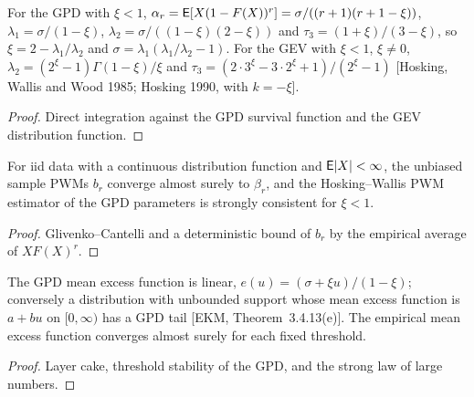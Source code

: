 \begin{theorem}
  \label{thm:l-moments}
  \leanok
  For the GPD with $\xi < 1$, $\alpha_r = \mathsf{E}[X(1-F(X))^r] = \sigma/((r+1)(r+1-\xi))$, $\lambda_1 = \sigma/(1-\xi)$,
  $\lambda_2 = \sigma/((1-\xi)(2-\xi))$ and $\tau_3 = (1+\xi)/(3-\xi)$, so $\xi = 2 - \lambda_1/\lambda_2$ and $\sigma = \lambda_1(\lambda_1/\lambda_2 - 1)$.
  For the GEV with $\xi < 1$, $\xi \ne 0$, $\lambda_2 = (2^\xi - 1)\Gamma(1-\xi)/\xi$ and $\tau_3 = (2 \cdot 3^\xi - 3 \cdot 2^\xi + 1)/(2^\xi - 1)$
  [Hosking, Wallis and Wood 1985; Hosking 1990, with $k = -\xi$].
\end{theorem}
\begin{proof}
  \leanok
  Direct integration against the GPD survival function and the GEV distribution function.
\end{proof}

\begin{theorem}
  \label{thm:pwm-consistency}
  \leanok
  For iid data with a continuous distribution function and $\mathsf{E}|X| < \infty$, the unbiased sample PWMs $b_r$ converge almost
  surely to $\beta_r$, and the Hosking--Wallis PWM estimator of the GPD parameters is strongly consistent for $\xi < 1$.
\end{theorem}
\begin{proof}
  \leanok
  Glivenko--Cantelli and a deterministic bound of $b_r$ by the empirical average of $X F(X)^r$.
\end{proof}

\begin{theorem}
  \label{thm:mean-excess}
  \leanok
  The GPD mean excess function is linear, $e(u) = (\sigma + \xi u)/(1-\xi)$; conversely a distribution with unbounded support whose
  mean excess function is $a + bu$ on $[0,\infty)$ has a GPD tail [EKM, Theorem~3.4.13(e)]. The empirical mean excess function
  converges almost surely for each fixed threshold.
\end{theorem}
\begin{proof}
  \leanok
  Layer cake, threshold stability of the GPD, and the strong law of large numbers.
\end{proof}

